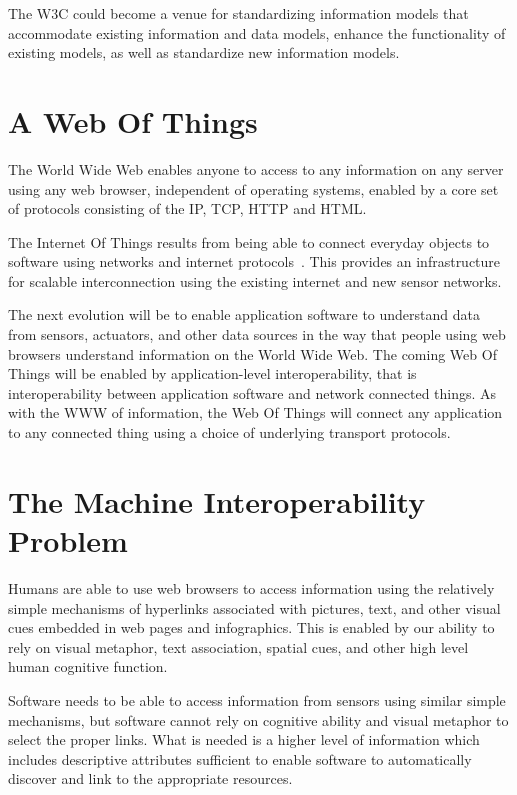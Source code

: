 \documentclass[journal]{IEEEtran}
\begin{document}
The W3C could become a venue for standardizing information models that accommodate existing information and data models, enhance the functionality of existing models, as well as standardize new information models. 


\section{A Web Of Things}

The World Wide Web enables anyone to access to any information on any server using any web browser, independent of operating systems, enabled by a core set of protocols consisting of the IP, TCP, HTTP and HTML. 

The Internet Of Things results from being able to connect everyday objects to software using networks and internet protocols~\cite{RFC6574}. This provides an infrastructure for scalable interconnection using the existing internet and new sensor networks. 

The next evolution will be to enable application software to understand data from sensors, actuators, and other data sources in the way that people using web browsers understand information on the World Wide Web. The coming Web Of Things will be enabled by application-level interoperability, that is interoperability between application software and network connected things. As with the WWW of information, the Web Of Things will connect any application to any connected thing using a choice of underlying transport protocols.

\section{The Machine Interoperability Problem}
Humans are able to use web browsers to access information using the relatively simple mechanisms of hyperlinks associated with pictures, text, and other visual cues embedded in web pages and infographics. This is enabled by our ability to rely on visual metaphor, text association, spatial cues, and other high level human cognitive function.

Software needs to be able to access information from sensors using similar simple mechanisms, but software cannot rely on cognitive ability and visual metaphor to select the proper links. What is needed is a higher level of information which includes descriptive attributes sufficient to enable software to automatically discover and link to the appropriate resources.
\end{document}
